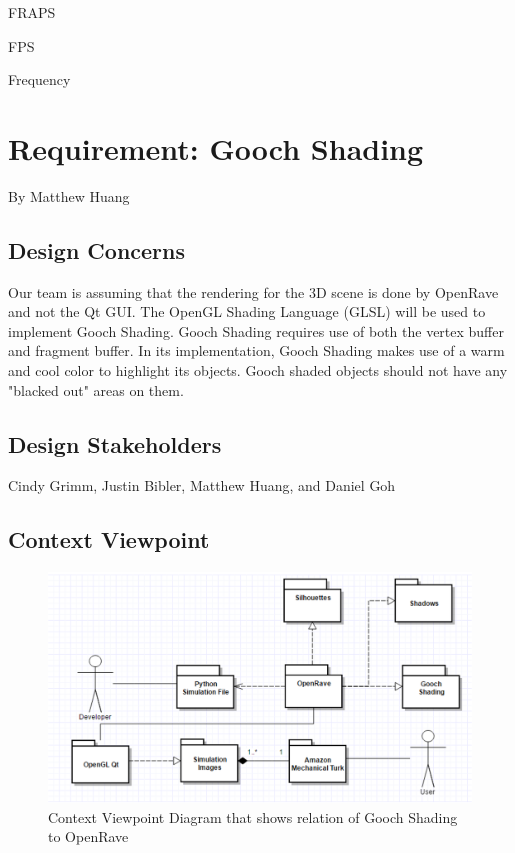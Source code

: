 \documentclass[10pt,journal,compsoc,draftclsnofoot]{IEEEtran}
\begin{document}
\begin{flushleft}
FRAPS

FPS

Frequency

\newpage

\section{Requirement: Gooch Shading}
\large{By Matthew Huang}

\normalsize
\subsection{Design Concerns}
Our team is assuming that the rendering for the 3D scene is done by OpenRave and not the Qt GUI.
The OpenGL Shading Language (GLSL) will be used to implement Gooch Shading. 
Gooch Shading requires use of both the vertex buffer and fragment buffer.
In its implementation, Gooch Shading makes use of a warm and cool color to highlight its objects.
Gooch shaded objects should not have any "blacked out" areas on them.

\subsection{Design Stakeholders}
Cindy Grimm, Justin Bibler, Matthew Huang, and Daniel Goh

\subsection{Context Viewpoint}

\begin{figure} [H]
  \includegraphics[scale=0.8]{Gooch_Shading_context.eps}
  \caption
{ \newline \hspace{\linewidth}
Context Viewpoint Diagram that shows relation of Gooch Shading to OpenRave}
  \label{fig:Gooch_Shading_context}
\end{figure}


\end{flushleft}
\end{document}
